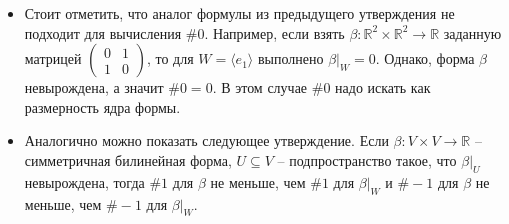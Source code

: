 \begin{itemize}
\item Стоит отметить, что аналог формулы из предыдущего утверждения не подходит для вычисления $\#0$.
Например, если взять $\beta\colon \mathbb R^2 \times \mathbb R^2 \to \mathbb R$ заданную матрицей $\left(\begin{smallmatrix}{0}&{1}\\{1}&{0}\end{smallmatrix}\right)$, то для $W = \langle e_1\rangle$ выполнено $\beta|_W = 0$.
Однако, форма $\beta$ невырождена, а значит $\#0 = 0$.
В этом случае $\#0$ надо искать как размерность ядра формы.

\item Аналогично можно показать следующее утверждение.
Если $\beta\colon V\times V\to \mathbb R$ -- симметричная билинейная форма, $U\subseteq V$ -- подпространство такое, что $\beta|_U$ невырождена, тогда $\# 1$ для $\beta$ не меньше, чем $\# 1$ для $\beta|_W$ и $\#-1$ для $\beta$ не меньше, чем $\#-1$ для $\beta|_W$.
\end{itemize}

